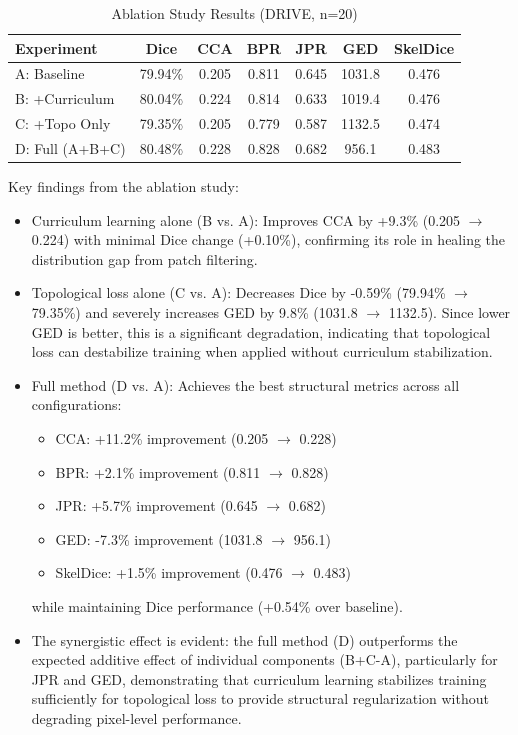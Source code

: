 \documentclass[conference]{IEEEtran}
\begin{document}
\begin{table}[htbp]
\caption{Ablation Study Results (DRIVE, n=20)}
\label{tab:ablation}
\centering
\footnotesize
\setlength{\tabcolsep}{4pt}
\begin{tabular}{lcccccc}
\toprule
\textbf{Experiment} & \textbf{Dice} & \textbf{CCA} & \textbf{BPR} & \textbf{JPR} & \textbf{GED} & \textbf{SkelDice} \\
\midrule
A: Baseline & 79.94\% & 0.205 & 0.811 & 0.645 & 1031.8 & 0.476 \\
B: +Curriculum & 80.04\% & 0.224 & 0.814 & 0.633 & 1019.4 & 0.476 \\
C: +Topo Only & 79.35\% & 0.205 & 0.779 & 0.587 & 1132.5 & 0.474 \\
D: Full (A+B+C) & 80.48\% & 0.228 & 0.828 & 0.682 & 956.1 & 0.483 \\
\bottomrule
\end{tabular}
\end{table}

Key findings from the ablation study:
\begin{itemize}
    \item Curriculum learning alone (B vs. A): Improves CCA by +9.3\% (0.205 $\rightarrow$ 0.224) with minimal Dice change (+0.10\%), confirming its role in healing the distribution gap from patch filtering.
    \item Topological loss alone (C vs. A): Decreases Dice by -0.59\% (79.94\% $\rightarrow$ 79.35\%) and severely increases GED by 9.8\% (1031.8 $\rightarrow$ 1132.5). Since lower GED is better, this is a significant degradation, indicating that topological loss can destabilize training when applied without curriculum stabilization.
    \item Full method (D vs. A): Achieves the best structural metrics across all configurations:
        \begin{itemize}
            \item CCA: +11.2\% improvement (0.205 $\rightarrow$ 0.228)
            \item BPR: +2.1\% improvement (0.811 $\rightarrow$ 0.828)
            \item JPR: +5.7\% improvement (0.645 $\rightarrow$ 0.682)
            \item GED: -7.3\% improvement (1031.8 $\rightarrow$ 956.1)
            \item SkelDice: +1.5\% improvement (0.476 $\rightarrow$ 0.483)
        \end{itemize}
        while maintaining Dice performance (+0.54\% over baseline).
    \item The synergistic effect is evident: the full method (D) outperforms the expected additive effect of individual components (B+C-A), particularly for JPR and GED, demonstrating that curriculum learning stabilizes training sufficiently for topological loss to provide structural regularization without degrading pixel-level performance.
\end{itemize}
\end{document}
